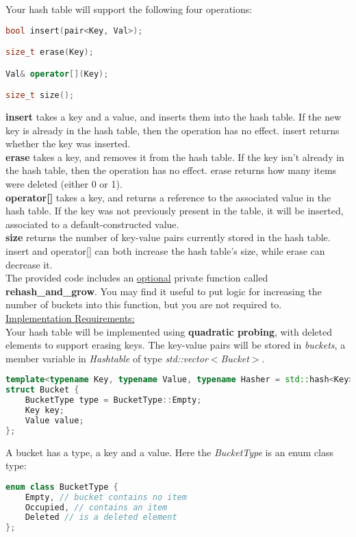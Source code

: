 \documentclass[11pt]{exam}
\begin{document}
Your hash table will support the following four operations:
\begin{lstlisting}[language=c++]
bool insert(pair<Key, Val>);

size_t erase(Key);

Val& operator[](Key);

size_t size();
\end{lstlisting}
\textbf{insert} takes a key and a value, and inserts them into the hash table. If the new key is already in the hash table, then the operation has no effect. insert returns whether the key was inserted.\\

\textbf{erase} takes a key, and removes it from the hash table. If the key isn’t already in the hash table, then the operation has no effect. erase returns how many items were deleted (either 0 or 1).\\

\textbf{operator[]} takes a key, and returns a reference to the associated value in the hash table. If the key was not previously present in the table, it will be inserted, associated to a default-constructed value.\\

\textbf{size} returns the number of key-value pairs currently stored in the hash table. insert and operator[] can both increase the hash table’s size, while erase can decrease it.\\

The provided code includes an \underline{optional} private function called \textbf{rehash\_and\_grow}. You may find it useful to put logic for increasing the number of buckets into this function, but you are not required to.\\

\underline{Implementation Requirements:}\\

Your hash table will be implemented using \textbf{quadratic probing}, with deleted elements to support erasing keys. The key-value pairs will be stored in \textit{buckets}, a member variable in \textit{Hashtable} of type \textit{std::vector$<$Bucket$>$}.

\begin{lstlisting}[language=c++]
template<typename Key, typename Value, typename Hasher = std::hash<Key>>
struct Bucket {
	BucketType type = BucketType::Empty;
	Key key;
	Value value;
};
\end{lstlisting}

A bucket has a type, a key and a value. Here the \textit{BucketType} is an enum class type:
\begin{lstlisting}[language=c++]
enum class BucketType {
	Empty, // bucket contains no item
	Occupied, // contains an item
	Deleted // is a deleted element
};
\end{lstlisting}
\end{document}
